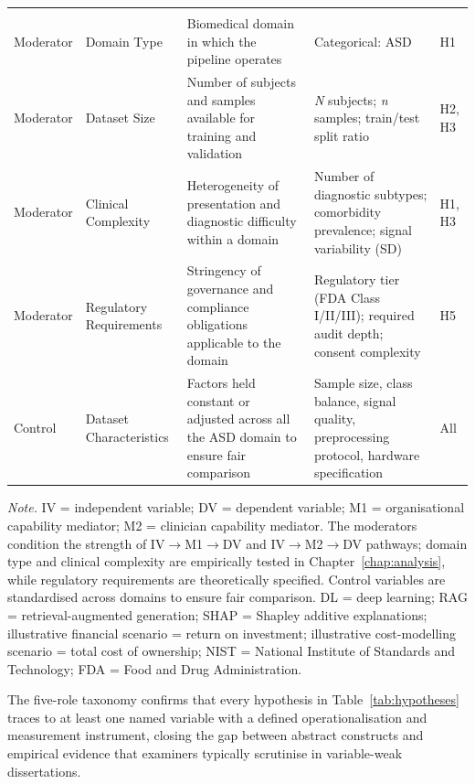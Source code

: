 {\begin{xltabular}{\textwidth}{@{} >{\raggedright\arraybackslash}p{1.5cm} >{\raggedright\arraybackslash}p{2cm} L L >{\raggedright\arraybackslash}p{1.2cm} @{}}
\midrule
{} \\
\addlinespace
Moderator & Domain Type & Biomedical domain in which the pipeline operates & Categorical: ASD & H1 \\
\addlinespace
Moderator & Dataset Size & Number of subjects and samples available for training and validation & \textit{N} subjects; \textit{n} samples; train/test split ratio & H2, H3 \\
\addlinespace
Moderator & Clinical Complexity & Heterogeneity of presentation and diagnostic difficulty within a domain & Number of diagnostic subtypes; comorbidity prevalence; signal variability (SD) & H1, H3 \\
\addlinespace
Moderator & Regulatory Requirements & Stringency of governance and compliance obligations applicable to the domain & Regulatory tier (FDA Class I/II/III); required audit depth; consent complexity & H5 \\
\addlinespace
Control & Dataset Characteristics & Factors held constant or adjusted across all the ASD domain to ensure fair comparison & Sample size, class balance, signal quality, preprocessing protocol, hardware specification & All \\
\end{xltabular}}
\vspace{0.5em}
\noindent\textit{Note.} IV = independent variable; DV = dependent variable; M1 = organisational capability mediator; M2 = clinician capability mediator. The moderators condition the strength of IV$\to$M1$\to$DV and IV$\to$M2$\to$DV pathways; domain type and clinical complexity are empirically tested in Chapter~\ref{chap:analysis}, while regulatory requirements are theoretically specified. Control variables are standardised across domains to ensure fair comparison. DL = deep learning; RAG = retrieval-augmented generation; SHAP = Shapley additive explanations; illustrative financial scenario = return on investment; illustrative cost-modelling scenario = total cost of ownership; NIST = National Institute of Standards and Technology; FDA = Food and Drug Administration.


\noindent The five-role taxonomy confirms that every hypothesis in Table~\ref{tab:hypotheses} traces to at least one named variable with a defined operationalisation and measurement instrument, closing the gap between abstract constructs and empirical evidence that examiners typically scrutinise in variable-weak dissertations.
\fi %

